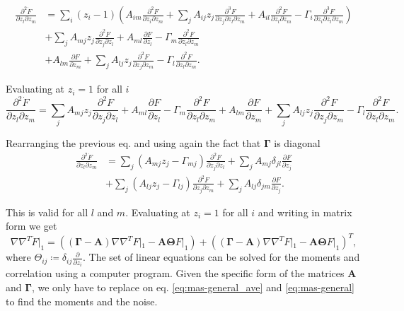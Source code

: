 \begin{equation*}
  \begin{split}
    \frac{\partial^2 \dot{F}}{\partial z_l \partial z_m} &= \sum_i(z_i-1) \left(A_{im}\frac{\partial^2F}{\partial z_i \partial z_m} + \sum_jA_{ij}z_j\frac{\partial^3F}{\partial z_j \partial z_l \partial z_m}+A_{il}\frac{\partial^2F}{\partial z_l\partial z_m} - \Gamma_i\frac{\partial^3F}{\partial z_i \partial z_l \partial z_m}   \right)\\
    &+\sum_jA_{mj}z_j\frac{\partial^2F}{\partial z_j\partial z_l}+A_{ml}\frac{\partial F}{\partial z_l} - \Gamma_m\frac{\partial^2F}{\partial z_l\partial z_m}\\
    &+ A_{lm}\frac{\partial F}{\partial z_m} + \sum_jA_{lj}z_j\frac{\partial^2F}{\partial z_j\partial z_m}-\Gamma_l\frac{\partial^2F}{\partial z_l\partial z_m}.
  \end{split}
\end{equation*}

Evaluating at $z_i=1$ for all $i$
\begin{equation*}
  \frac{\partial^2\dot{F}}{\partial z_l \partial z_m} = \sum_jA_{mj}z_j\frac{\partial^2F}{\partial z_j\partial z_l}+A_{ml}\frac{\partial F}{\partial z_l} - \Gamma_m\frac{\partial^2F}{\partial z_l\partial z_m} + A_{lm}\frac{\partial F}{\partial z_m} + \sum_jA_{lj}z_j\frac{\partial^2F}{\partial z_j\partial z_m}-\Gamma_l\frac{\partial^2F}{\partial z_l\partial z_m}.
\end{equation*}

Rearranging the previous eq. and using again the fact that $\mathbf{\Gamma}$ is diagonal
\begin{equation*}
  \begin{split}
    \frac{\partial^2\dot{F}}{\partial z_l \partial z_m} &= \sum_j\left(A_{mj}z_j-\Gamma_{mj}\right)\frac{\partial^2F}{\partial z_j\partial z_l} + \sum_jA_{mj}\delta_{jl}\frac{\partial F}{\partial z_j}\\
    &+\sum_j\left(A_{lj}z_j-\Gamma_{lj}\right)\frac{\partial^2F}{\partial z_j\partial z_m} + \sum_jA_{lj}\delta_{jm}\frac{\partial F}{\partial z_j}.
  \end{split}
\end{equation*}

This is valid for all $l$ and $m$. Evaluating at $z_i=1$ for all $i$ and writing in matrix form we get
\begin{equation}
  \label{eq:mas-general}
  \nabla\nabla^T\dot{F}|_1 = \left(\left(\mathbf{\Gamma} - \mathbf{A}\right)\nabla\nabla^TF|_1 - \mathbf{A}\mathbf{\Theta} F|_1\right)+\left(\left(\mathbf{\Gamma} - \mathbf{A}\right)\nabla\nabla^TF|_1 - \mathbf{A}\mathbf{\Theta} F|_1\right)^T,
\end{equation}
where $\Theta_{ij} \coloneqq \delta_{ij}\frac{\partial}{\partial z_i}$. The set of linear equations can be solved for the moments and correlation using a computer program. Given the specific form of the matrices $\mathbf{A}$ and $\mathbf{\Gamma}$, we only have to replace on eq. \eqref{eq:mas-general_ave} and \eqref{eq:mas-general} to find the moments and the noise.

